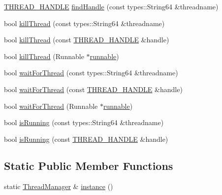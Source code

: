 \begin{DoxyCompactItemize}
\hyperlink{threading_8h_a14c0f3061b88e46a595ca858fed22b03}{T\-H\-R\-E\-A\-D\-\_\-\-H\-A\-N\-D\-L\-E} \hyperlink{classcrap_1_1threading_1_1_thread_manager_a1da6e28b04d2ba0d73315a8d1683a99f}{find\-Handle} (const types\-::\-String64 \&threadname)
\item 
bool \hyperlink{classcrap_1_1threading_1_1_thread_manager_a9153ec7ed6bdd67ac01fc57befe24685}{kill\-Thread} (const types\-::\-String64 \&threadname)
\item 
bool \hyperlink{classcrap_1_1threading_1_1_thread_manager_aefa00017c8ce81404d75b8a2abeb7082}{kill\-Thread} (const \hyperlink{threading_8h_a14c0f3061b88e46a595ca858fed22b03}{T\-H\-R\-E\-A\-D\-\_\-\-H\-A\-N\-D\-L\-E} \&handle)
\item 
bool \hyperlink{classcrap_1_1threading_1_1_thread_manager_a5be40fe00e4127d46d63c6459f14c56a}{kill\-Thread} (Runnable $\ast$\hyperlink{classcrap_1_1runnable}{runnable})
\item 
bool \hyperlink{classcrap_1_1threading_1_1_thread_manager_a69c11b2d0182efbdae1548c41272da9a}{wait\-For\-Thread} (const types\-::\-String64 \&threadname)
\item 
bool \hyperlink{classcrap_1_1threading_1_1_thread_manager_a647bda8ee1c601fcacb7c34d0d96211a}{wait\-For\-Thread} (const \hyperlink{threading_8h_a14c0f3061b88e46a595ca858fed22b03}{T\-H\-R\-E\-A\-D\-\_\-\-H\-A\-N\-D\-L\-E} \&handle)
\item 
bool \hyperlink{classcrap_1_1threading_1_1_thread_manager_a3c185bc987cf580fa21b574e68447d4b}{wait\-For\-Thread} (Runnable $\ast$\hyperlink{classcrap_1_1runnable}{runnable})
\item 
bool \hyperlink{classcrap_1_1threading_1_1_thread_manager_a9574a8627e7ad202ccea926b1868977c}{is\-Running} (const types\-::\-String64 \&threadname)
\item 
bool \hyperlink{classcrap_1_1threading_1_1_thread_manager_a2a63e09eea20fd9de977b84bfadd67ce}{is\-Running} (const \hyperlink{threading_8h_a14c0f3061b88e46a595ca858fed22b03}{T\-H\-R\-E\-A\-D\-\_\-\-H\-A\-N\-D\-L\-E} \&handle)
\end{DoxyCompactItemize}
\subsection*{Static Public Member Functions}
\begin{DoxyCompactItemize}
\item 
static \hyperlink{classcrap_1_1threading_1_1_thread_manager}{Thread\-Manager} \& \hyperlink{classcrap_1_1threading_1_1_thread_manager_a4124d6691f8280d2ae5bfca4448244bc}{instance} ()
\end{DoxyCompactItemize}


